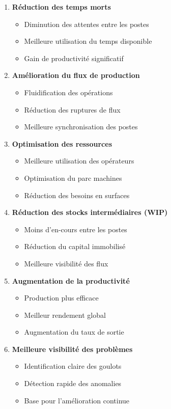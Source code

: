 \documentclass[12pt,a4paper]{article}
\begin{document}
\begin{enumerate}
    \item \textbf{Réduction des temps morts}
    \begin{itemize}
        \item Diminution des attentes entre les postes
        \item Meilleure utilisation du temps disponible
        \item Gain de productivité significatif
    \end{itemize}
    
    \item \textbf{Amélioration du flux de production}
    \begin{itemize}
        \item Fluidification des opérations
        \item Réduction des ruptures de flux
        \item Meilleure synchronisation des postes
    \end{itemize}
    
    \item \textbf{Optimisation des ressources}
    \begin{itemize}
        \item Meilleure utilisation des opérateurs
        \item Optimisation du parc machines
        \item Réduction des besoins en surfaces
    \end{itemize}
    
    \item \textbf{Réduction des stocks intermédiaires (WIP)}
    \begin{itemize}
        \item Moins d'en-cours entre les postes
        \item Réduction du capital immobilisé
        \item Meilleure visibilité des flux
    \end{itemize}
    
    \item \textbf{Augmentation de la productivité}
    \begin{itemize}
        \item Production plus efficace
        \item Meilleur rendement global
        \item Augmentation du taux de sortie
    \end{itemize}
    
    \item \textbf{Meilleure visibilité des problèmes}
    \begin{itemize}
        \item Identification claire des goulots
        \item Détection rapide des anomalies
        \item Base pour l'amélioration continue
    \end{itemize}
\end{enumerate}
\end{document}
